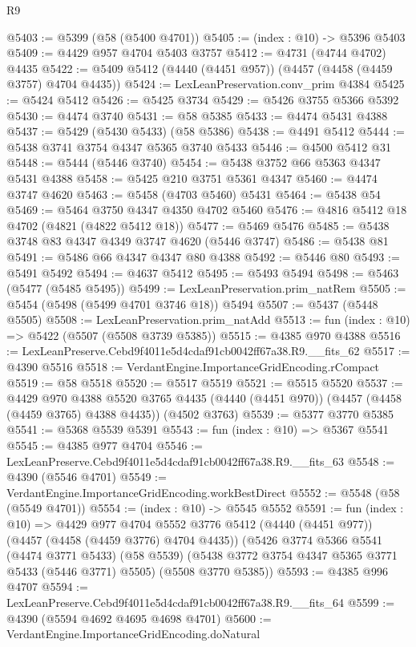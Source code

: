 \begin{lexlean}{R9}
\begin{coremodule}
@5403 := @5399 (@58 (@5400 @4701))
@5405 := (index : @10) -> @5396 @5403
@5409 := @4429 @957 @4704 @5403 @3757
@5412 := @4731 (@4744 @4702) @4435
@5422 := @5409 @5412 (@4440 (@4451 @957)) (@4457 (@4458 (@4459 @3757) @4704 @4435))
@5424 := LexLeanPreservation.conv_prim @4384
@5425 := @5424 @5412
@5426 := @5425 @3734
@5429 := @5426 @3755 @5366 @5392
@5430 := @4474 @3740
@5431 := @58 @5385
@5433 := @4474 @5431 @4388
@5437 := @5429 (@5430 @5433) (@58 @5386)
@5438 := @4491 @5412
@5444 := @5438 @3741 @3754 @4347 @5365 @3740 @5433
@5446 := @4500 @5412 @31
@5448 := @5444 (@5446 @3740)
@5454 := @5438 @3752 @66 @5363 @4347 @5431 @4388
@5458 := @5425 @210 @3751 @5361 @4347
@5460 := @4474 @3747 @4620
@5463 := @5458 (@4703 @5460) @5431
@5464 := @5438 @54
@5469 := @5464 @3750 @4347 @4350 @4702 @5460
@5476 := @4816 @5412 @18 @4702 (@4821 (@4822 @5412 @18))
@5477 := @5469 @5476
@5485 := @5438 @3748 @83 @4347 @4349 @3747 @4620 (@5446 @3747)
@5486 := @5438 @81
@5491 := @5486 @66 @4347 @4347 @80 @4388
@5492 := @5446 @80
@5493 := @5491 @5492
@5494 := @4637 @5412
@5495 := @5493 @5494
@5498 := @5463 (@5477 (@5485 @5495))
@5499 := LexLeanPreservation.prim_natRem
@5505 := @5454 (@5498 (@5499 @4701 @3746 @18)) @5494
@5507 := @5437 (@5448 @5505)
@5508 := LexLeanPreservation.prim_natAdd
@5513 := fun (index : @10) => @5422 (@5507 (@5508 @3739 @5385))
@5515 := @4385 @970 @4388
@5516 := LexLeanPreserve.Cebd9f4011e5d4cdaf91cb0042ff67a38.R9.__fits_62
@5517 := @4390 @5516
@5518 := VerdantEngine.ImportanceGridEncoding.rCompact
@5519 := @58 @5518
@5520 := @5517 @5519
@5521 := @5515 @5520
@5537 := @4429
    @970
    @4388
    @5520
    @3765
    @4435
    (@4440 (@4451 @970))
    (@4457 (@4458 (@4459 @3765) @4388 @4435))
    (@4502 @3763)
@5539 := @5377 @3770 @5385
@5541 := @5368 @5539 @5391
@5543 := fun (index : @10) => @5367 @5541
@5545 := @4385 @977 @4704
@5546 := LexLeanPreserve.Cebd9f4011e5d4cdaf91cb0042ff67a38.R9.__fits_63
@5548 := @4390 (@5546 @4701)
@5549 := VerdantEngine.ImportanceGridEncoding.workBestDirect
@5552 := @5548 (@58 (@5549 @4701))
@5554 := (index : @10) -> @5545 @5552
@5591 := fun (index : @10) =>
  @4429
    @977
    @4704
    @5552
    @3776
    @5412
    (@4440 (@4451 @977))
    (@4457 (@4458 (@4459 @3776) @4704 @4435))
    (@5426
      @3774
      @5366
      @5541
      (@4474 @3771 @5433)
      (@58 @5539)
      (@5438 @3772 @3754 @4347 @5365 @3771 @5433 (@5446 @3771) @5505)
      (@5508 @3770 @5385))
@5593 := @4385 @996 @4707
@5594 := LexLeanPreserve.Cebd9f4011e5d4cdaf91cb0042ff67a38.R9.__fits_64
@5599 := @4390 (@5594 @4692 @4695 @4698 @4701)
@5600 := VerdantEngine.ImportanceGridEncoding.doNatural

\end{coremodule}
\end{lexlean}
